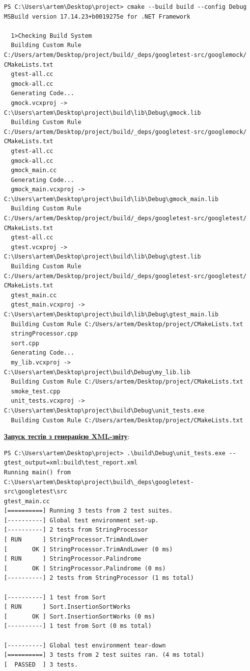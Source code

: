 \documentclass[a4paper,12pt]{article}
\begin{document}
    \begin{verbatim}
PS C:\Users\artem\Desktop\project> cmake --build build --config Debug
MSBuild version 17.14.23+b0019275e for .NET Framework

  1>Checking Build System
  Building Custom Rule C:/Users/artem/Desktop/project/build/_deps/googletest-src/googlemock/
CMakeLists.txt
  gtest-all.cc
  gmock-all.cc
  Generating Code...
  gmock.vcxproj -> C:\Users\artem\Desktop\project\build\lib\Debug\gmock.lib
  Building Custom Rule C:/Users/artem/Desktop/project/build/_deps/googletest-src/googlemock/
CMakeLists.txt
  gtest-all.cc
  gmock-all.cc
  gmock_main.cc
  Generating Code...
  gmock_main.vcxproj -> C:\Users\artem\Desktop\project\build\lib\Debug\gmock_main.lib
  Building Custom Rule C:/Users/artem/Desktop/project/build/_deps/googletest-src/googletest/
CMakeLists.txt
  gtest-all.cc
  gtest.vcxproj -> C:\Users\artem\Desktop\project\build\lib\Debug\gtest.lib
  Building Custom Rule C:/Users/artem/Desktop/project/build/_deps/googletest-src/googletest/
CMakeLists.txt
  gtest_main.cc
  gtest_main.vcxproj -> C:\Users\artem\Desktop\project\build\lib\Debug\gtest_main.lib
  Building Custom Rule C:/Users/artem/Desktop/project/CMakeLists.txt
  stringProcessor.cpp
  sort.cpp
  Generating Code...
  my_lib.vcxproj -> C:\Users\artem\Desktop\project\build\Debug\my_lib.lib
  Building Custom Rule C:/Users/artem/Desktop/project/CMakeLists.txt
  smoke_test.cpp
  unit_tests.vcxproj -> C:\Users\artem\Desktop\project\build\Debug\unit_tests.exe
  Building Custom Rule C:/Users/artem/Desktop/project/CMakeLists.txt
    \end{verbatim}

    \textbf{\underline{Запуск тестів з генерацією XML-звіту}}:

    \begin{verbatim}
PS C:\Users\artem\Desktop\project> .\build\Debug\unit_tests.exe --gtest_output=xml:build\test_report.xml
Running main() from C:\Users\artem\Desktop\project\build\_deps\googletest-src\googletest\src
gtest_main.cc
[==========] Running 3 tests from 2 test suites.
[----------] Global test environment set-up.
[----------] 2 tests from StringProcessor
[ RUN      ] StringProcessor.TrimAndLower
[       OK ] StringProcessor.TrimAndLower (0 ms)
[ RUN      ] StringProcessor.Palindrome
[       OK ] StringProcessor.Palindrome (0 ms)
[----------] 2 tests from StringProcessor (1 ms total)

[----------] 1 test from Sort
[ RUN      ] Sort.InsertionSortWorks
[       OK ] Sort.InsertionSortWorks (0 ms)
[----------] 1 test from Sort (0 ms total)

[----------] Global test environment tear-down
[==========] 3 tests from 2 test suites ran. (4 ms total)
[  PASSED  ] 3 tests.
    \end{verbatim}
\end{document}
